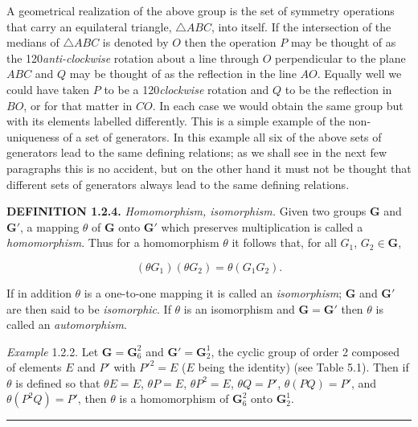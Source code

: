 \documentclass[11pt,a4paper,twoside,openright]{book}
\begin{document}
A geometrical realization of the above group is the set of symmetry operations that carry an equilateral triangle, $\triangle ABC$, into itself. If the intersection of the medians of $\triangle ABC$ is denoted by $O$ then the operation $P$ may be thought of as the 120\textdegree  \textit{anti-clockwise} rotation about a line through $O$ perpendicular to the plane $ABC$ and $Q$ may be thought of as the reflection in the line $AO$. Equally well we could have taken $P$ to be a 120\textdegree  \textit{clockwise} rotation and $Q$ to be the reflection in $BO$, or for that matter in $CO$. In each case we would obtain the same group but with its elements labelled differently. This is a simple example of the non-uniqueness of a set of generators. In this example all six of the above sets of generators lead to the same defining relations; as we shall see in the next few paragraphs this is no accident, but on the other hand it must not be thought that different sets of generators always lead to the same defining relations.

\textbf{DEFINITION 1.2.4.} \textit{Homomorphism, isomorphism.} Given two groups $\mathbf{G}$ and $\mathbf{G}'$, a mapping $\theta$ of $\mathbf{G}$ onto $\mathbf{G}'$ which preserves multiplication is called a \textit{homomorphism}. Thus for a homomorphism $\theta$ it follows that, for all $G_{1}$, $G_{2} \in \mathbf{G}$,

\begin{equation*}
(\theta G_{1})(\theta G_{2}) = \theta(G_{1}G_{2}). \tag{1.2.1}
\end{equation*}

If in addition $\theta$ is a one-to-one mapping it is called an \textit{isomorphism}; $\mathbf{G}$ and $\mathbf{G}'$ are then said to be \textit{isomorphic}. If $\theta$ is an isomorphism and $\mathbf{G} = \mathbf{G}'$ then $\theta$ is called an \textit{automorphism}.

\textit{Example} 1.2.2. Let $\mathbf{G} = \mathbf{G}_6^2$ and $\mathbf{G}' = \mathbf{G}_2^1$, the cyclic group of order 2 composed of elements $E$ and $P'$ with $P'^{2} = E$ ($E$ being the identity) (see Table 5.1). Then if $\theta$ is defined so that $\theta E = E$, $\theta P = E$, $\theta P^{2} = E$, $\theta Q = P'$, $\theta(PQ) = P'$, and $\theta(P^{2}Q) = P'$, then $\theta$ is a homomorphism of $\mathbf{G}_6^2$ onto $\mathbf{G}_2^1$.

\bigskip\hrule\bigskip
\end{document}
